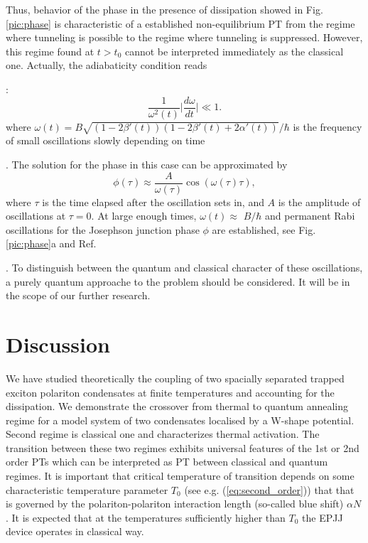 \documentclass[fleqn,10pt]{wlscirep}
\begin{document}
Thus, behavior of the phase in the presence of dissipation showed in Fig. \ref{pic:phase} is characteristic of a established non-equilibrium PT from the regime where tunneling is possible to the regime where tunneling is suppressed.
However, this regime found at $t>t_0$ cannot be interpreted immediately as the classical one.
Actually, the adiabaticity condition reads {\cite{Sols}:
%
\begin{equation}
\dfrac{1}{\omega^2(t)} \Big| \dfrac{d \omega}{d t} \Big| \ll 1.
\end{equation}
%
where $\omega(t) = B \sqrt{(1 - 2 \beta'(t))(1 - 2 \beta'(t) + 2 \alpha'(t))}/ \hbar $ is the frequency of small oscillations slowly depending on time {\cite{Sedov}. 
The solution for the phase in this case can be approximated by 
\begin{equation}
\phi(\tau) \approx \dfrac{A}{\omega(\tau)} \cos (\omega(\tau) \tau),
\end{equation}
%
where $\tau$ is the time elapsed after the oscillation sets in, and $A$ is the amplitude of oscillations at $\tau = 0$.
At large enough times, $\omega(t) \approx$ $B/ \hbar$ and permanent Rabi  oscillations for the Josephson junction phase $\phi$ are established, see Fig. \ref{pic:phase}a and Ref. {\cite{Permamemt}.
To distinguish between the quantum and classical character of these oscillations, a purely quantum approache to the problem should be considered.      
It will be in the scope of our further research.

\section*{Discussion \label{sec:conclusion}}

We have studied theoretically the coupling of two spacially separated trapped exciton polariton condensates at finite temperatures and accounting for the dissipation.
We demonstrate the crossover from thermal to quantum annealing regime for a model system of two condensates localised by a W-shape potential.
Second regime is classical one and characterizes  thermal activation.
The transition between these two regimes exhibits universal features of the 1st or 2nd order PTs which can be interpreted as PT between classical and quantum regimes. It is important that critical temperature of transition depends on some  characteristic temperature  parameter $T_{0}$ (see e.g. (\ref{eq:second_order})) that that is governed by the polariton-polariton interaction length (so-called blue shift) $\alpha N$.  It is expected that  at the temperatures sufficiently higher than  $T_{0}$ the EPJJ device operates in classical way. 

}}}
\end{document}
